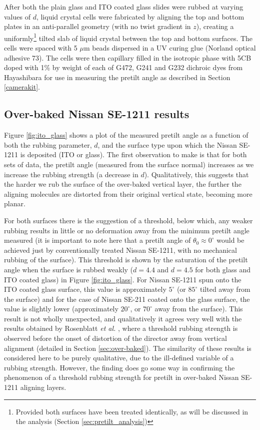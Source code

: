 After both the plain glass and ITO coated glass slides were rubbed at varying values of $d$, liquid crystal cells were fabricated by aligning the top and bottom plates in an anti-parallel geometry (with no twist gradient in $z$), creating a uniformly\footnote{Provided both surfaces have been treated identically, as will be discussed in the analysis (Section \ref{sec:pretilt_analysis})} tilted slab of liquid crystal between the top and bottom surfaces. The cells were spaced with 5 $\mu$m beads dispersed in a UV curing glue (Norland optical adhesive 73). The cells were then capillary filled in the isotropic phase with 5CB doped with 1\% by weight of each of G472, G241 and G232 dichroic dyes from Hayashibara for use in measuring the pretilt angle as described in Section \ref{camerakit}.


\subsection{Over-baked Nissan SE-1211 results}
\label{sec:1211_results}
Figure \ref{fig:ito_glass} shows a plot of the measured pretilt angle as a function of both the rubbing parameter, $d$, and the surface type upon which the Nissan SE-1211 is deposited (ITO or glass). The first observation to make is that for both sets of data, the pretilt angle (measured from the surface normal) increases as we increase the rubbing strength (a decrease in $d$). Qualitatively, this suggests that the harder we rub the surface of the over-baked vertical layer, the further the aligning molecules are distorted from their original vertical state, becoming more planar.

For both surfaces there is the suggestion of a threshold, below which, any weaker rubbing results in little or no deformation away from the minimum pretilt angle measured (it is important to note here that a pretilt angle of $\theta_0\approx0^{\circ}$ would be achieved just by conventionally treated Nissan SE-1211, with no mechanical rubbing of the surface). This threshold is shown by the saturation of the pretilt angle when the surface is rubbed weakly ($d=4.4$ and $d=4.5$ for both glass and ITO coated glass) in Figure \ref{fig:ito_glass}. For Nissan SE-1211 spun onto the ITO coated glass surface, this value is approximately $5^{\circ}$ (or $85^{\circ}$ tilted away from the surface) and for the case of Nissan SE-211 coated onto the glass surface, the value is slightly lower (approximately $20^{\circ}$, or $70^{\circ}$ away from the surface). This result is not wholly unexpected, and qualitatively it agrees very well with the results obtained by Rosenblatt \textit{et al.} \cite{Huang2005}, where a threshold rubbing strength is observed before the onset of distortion of the director away from vertical alignment (detailed in Section \ref{sec:over-baked}). The similarity of these results is considered here to be purely qualitative, due to the ill-defined variable of a rubbing strength. However, the finding does go some way in confirming the phenomenon of a threshold rubbing strength for pretilt in over-baked Nissan SE-1211 aligning layers.

